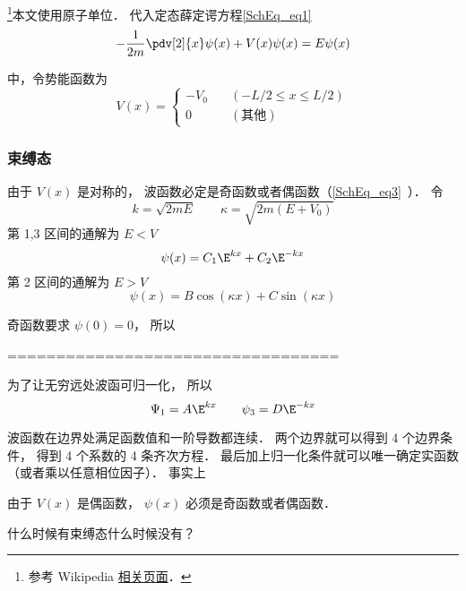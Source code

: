 




\footnote{参考 Wikipedia \href{https://en.wikipedia.org/wiki/Finite_potential_well}{相关页面}．}本文使用原子单位． 代入定态薛定谔方程\autoref{SchEq_eq1}~
\begin{equation}
-\frac{1}{2m}\pdv[2]{x}\psi(x) + V(x) \psi(x) = E \psi(x)
\end{equation}

中，令势能函数为
\begin{equation}
V(x) = \begin{cases}
-V_0 \quad &(-L/2 \leqslant x \leqslant L/2)\\
0 \quad &(\text{其他})
\end{cases}
\end{equation}

\subsubsection{束缚态}
由于 $V(x)$ 是对称的， 波函数必定是奇函数或者偶函数（\autoref{SchEq_eq3}~）． 令
\begin{equation}
k = \sqrt{2mE} \qquad \kappa = \sqrt{2m(E + V_0)}
\end{equation}
第 1,3 区间的通解为 $E < V$
\begin{equation}
\psi(x) = C_1 \E^{kx} + C_2 \E^{-kx}
\end{equation}
第 2 区间的通解为 $E > V$
\begin{equation}
\psi(x) = B \cos(\kappa x) + C\sin(\kappa x)
\end{equation}

奇函数要求 $\psi(0) = 0$， 所以

==================================





为了让无穷远处波函可归一化， 所以
\begin{equation}
\Psi_1 = A \E^{kx} \qquad \psi_3 = D\E^{-kx}
\end{equation}

波函数在边界处满足函数值和一阶导数都连续． 两个边界就可以得到 4 个边界条件， 得到 4 个系数的 4 条齐次方程． 最后加上归一化条件就可以唯一确定实函数（或者乘以任意相位因子）． 事实上


由于 $V(x)$ 是偶函数， $\psi(x)$ 必须是奇函数或者偶函数．




什么时候有束缚态什么时候没有？
